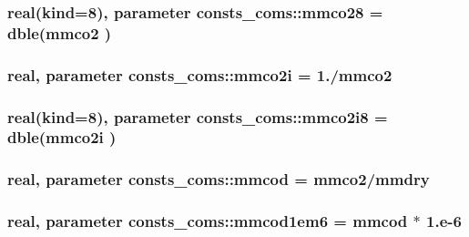 \subsubsection[{\texorpdfstring{mmco28}{mmco28}}]{\setlength{\rightskip}{0pt plus 5cm}real(kind=8), parameter consts\+\_\+coms\+::mmco28 = dble({\bf mmco2} )}\hypertarget{namespaceconsts__coms_a8b53e3487c484355ec731d35ae57186f}{}\label{namespaceconsts__coms_a8b53e3487c484355ec731d35ae57186f}
\subsubsection[{\texorpdfstring{mmco2i}{mmco2i}}]{\setlength{\rightskip}{0pt plus 5cm}real, parameter consts\+\_\+coms\+::mmco2i = 1./{\bf mmco2}}\hypertarget{namespaceconsts__coms_a2df5d20d56bdc29d0d392c9ec513752a}{}\label{namespaceconsts__coms_a2df5d20d56bdc29d0d392c9ec513752a}
\subsubsection[{\texorpdfstring{mmco2i8}{mmco2i8}}]{\setlength{\rightskip}{0pt plus 5cm}real(kind=8), parameter consts\+\_\+coms\+::mmco2i8 = dble({\bf mmco2i} )}\hypertarget{namespaceconsts__coms_a7a5da648279dbc405b51c92733fe9301}{}\label{namespaceconsts__coms_a7a5da648279dbc405b51c92733fe9301}
\subsubsection[{\texorpdfstring{mmcod}{mmcod}}]{\setlength{\rightskip}{0pt plus 5cm}real, parameter consts\+\_\+coms\+::mmcod = {\bf mmco2}/{\bf mmdry}}\hypertarget{namespaceconsts__coms_a35f71d51e4282f3fc1150564317c3a97}{}\label{namespaceconsts__coms_a35f71d51e4282f3fc1150564317c3a97}
\subsubsection[{\texorpdfstring{mmcod1em6}{mmcod1em6}}]{\setlength{\rightskip}{0pt plus 5cm}real, parameter consts\+\_\+coms\+::mmcod1em6 = {\bf mmcod} $\ast$ 1.e-\/6}\hypertarget{namespaceconsts__coms_a25939fc53475af3a61a853e5adf1940c}{}\label{namespaceconsts__coms_a25939fc53475af3a61a853e5adf1940c}
